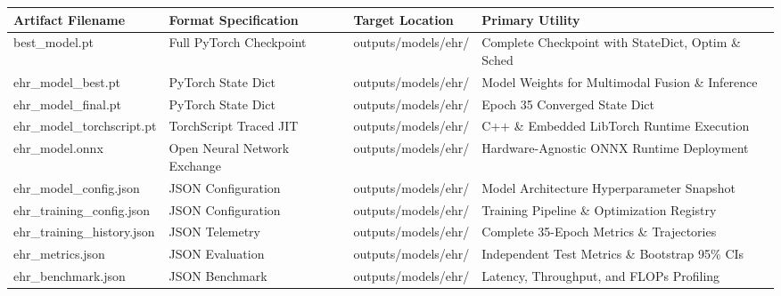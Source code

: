 \begin{tabular}{llll}
\toprule
Artifact Filename & Format Specification & Target Location & Primary Utility \\
\midrule
best\_model.pt & Full PyTorch Checkpoint & outputs/models/ehr/ & Complete Checkpoint with StateDict, Optim \& Sched \\
ehr\_model\_best.pt & PyTorch State Dict & outputs/models/ehr/ & Model Weights for Multimodal Fusion \& Inference \\
ehr\_model\_final.pt & PyTorch State Dict & outputs/models/ehr/ & Epoch 35 Converged State Dict \\
ehr\_model\_torchscript.pt & TorchScript Traced JIT & outputs/models/ehr/ & C++ \& Embedded LibTorch Runtime Execution \\
ehr\_model.onnx & Open Neural Network Exchange & outputs/models/ehr/ & Hardware-Agnostic ONNX Runtime Deployment \\
ehr\_model\_config.json & JSON Configuration & outputs/models/ehr/ & Model Architecture Hyperparameter Snapshot \\
ehr\_training\_config.json & JSON Configuration & outputs/models/ehr/ & Training Pipeline \& Optimization Registry \\
ehr\_training\_history.json & JSON Telemetry & outputs/models/ehr/ & Complete 35-Epoch Metrics \& Trajectories \\
ehr\_metrics.json & JSON Evaluation & outputs/models/ehr/ & Independent Test Metrics \& Bootstrap 95\% CIs \\
ehr\_benchmark.json & JSON Benchmark & outputs/models/ehr/ & Latency, Throughput, and FLOPs Profiling \\
\bottomrule
\end{tabular}
